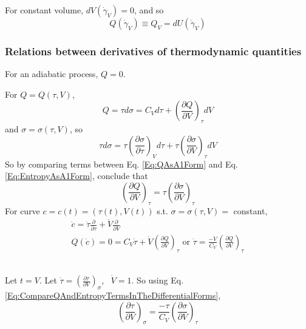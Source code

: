 \documentclass[10pt]{amsart}
\begin{document}
\begin{multicols*}{2}
For constant volume, $dV(\dot{\gamma}_V)=0$, and so 
\[
Q(\dot{\gamma}_V) \equiv Q_V = dU(\dot{\gamma}_V)
\]

\subsubsection{Relations between derivatives of thermodynamic quantities}

For an adiabatic process, $Q=0$. 

For $Q= Q(\tau, V)$, 
\begin{equation}\label{Eq:QAsA1Form}
Q = \tau d\sigma = C_V d\tau + \left( \frac{ \partial Q}{ \partial V} \right)_{\tau} dV
\end{equation}
and $\sigma = \sigma(\tau, V)$, so 
\begin{equation}\label{Eq:EntropyAsA1Form}
\tau d\sigma = \tau \left( \frac{ \partial \sigma}{ \partial \tau } \right)_V d\tau + \tau \left( \frac{ \partial \sigma}{ \partial V} \right)_{\tau} dV
\end{equation}
So by comparing terms between Eq. \ref{Eq:QAsA1Form} and Eq. \ref{Eq:EntropyAsA1Form}, conclude that 
\begin{equation}\label{Eq:CompareQAndEntropyTermsInTheDifferentialForms}
\left( \frac{ \partial Q}{ \partial V} \right)_{\tau} = \tau \left( \frac{ \partial \sigma}{\partial V} \right)_{\tau}
\end{equation} 
For curve $c= c(t) = (\tau(t), V(t))$ s.t. $\sigma = \sigma(\tau, V) = $ constant, 
\[
\begin{gathered}
 \dot{c} = \dot{\tau} \frac{ \partial }{ \partial \tau} + \dot{V} \frac{ \partial }{\partial V}  \\
 Q(\dot{c}) = 0 = C_V\dot{\tau} + \dot{V} \left( \frac{ \partial Q}{\partial V} \right)_{\tau} \text{ or } \dot{\tau} = \frac{- \dot{V}}{C_V} \left( \frac{\partial Q}{ \partial V} \right)_{\tau} 
\end{gathered}
\]

\quad \\ 
Let $t=V$. Let $\dot{\tau} = \left( \frac{\partial \tau}{\partial V} \right)_{\sigma}$, \, $\dot{V} = 1$.  So using Eq. \ref{Eq:CompareQAndEntropyTermsInTheDifferentialForms}, 
\begin{equation}\label{Eq:ConstantVolumeHeatCapacityDifferentialRelationship}
 \left( \frac{ \partial \tau}{ \partial V} \right)_{\sigma} = \frac{-\tau}{C_V} \left( \frac{ \partial \sigma}{ \partial V} \right)_{\tau}
\end{equation}


\end{multicols*}
\end{document}

